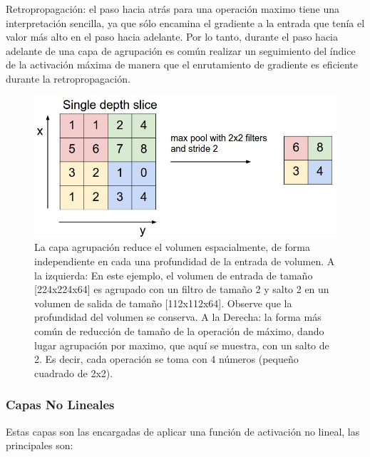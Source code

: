 \documentclass[a4paper,11pt,spanish]{book}
\begin{document}
	Retropropagación: el paso hacia atrás para una operación maximo tiene una interpretación sencilla, ya que sólo encamina el gradiente a la entrada que tenía el valor más alto
	en el paso hacia adelante. Por lo tanto, durante el paso hacia adelante de una capa de agrupación es común realizar un seguimiento del índice de la activación máxima de
	manera que el enrutamiento de gradiente es eficiente durante la retropropagación.

	\begin{figure}[H]
	  \includegraphics[scale=0.5]{./img/stanford_maxpool.jpeg}
	  \caption{La capa agrupación reduce el volumen espacialmente, de forma independiente en cada una profundidad de la entrada de volumen.
	    A la izquierda: En este ejemplo, el volumen de entrada de tamaño [224x224x64] es agrupado con un filtro de tamaño 2 y salto 2 en un volumen de salida de tamaño [112x112x64].
	    Observe que la profundidad del volumen se conserva. A la Derecha: la forma más común de reducción de tamaño de la operación de máximo, dando lugar agrupación por maximo,
	    que aquí se muestra, con un salto de 2. Es decir, cada operación se toma con 4 números (pequeño cuadrado de 2x2).}
	  \label{fig:maxpool_layer}
	\end{figure}

      \subsubsection{Capas No Lineales}
	Estas capas son las encargadas de aplicar una función de activación no lineal, las principales son:
\end{document}
